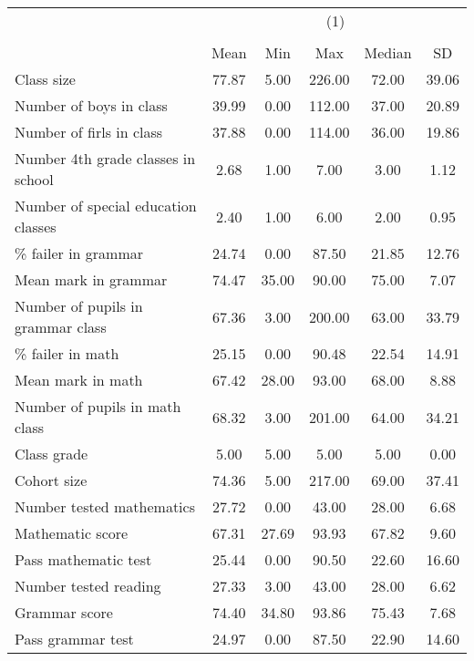 {
\def\sym#1{\ifmmode^{#1}\else\(^{#1}\)\fi}
\begin{tabular}{l*{1}{ccccc}}
\hline\hline
                    &\multicolumn{5}{c}{(1)}                                         \\
                    &\multicolumn{5}{c}{}                                            \\
                    &        Mean&         Min&         Max&      Median&          SD\\
\hline
Class size          &       77.87&        5.00&      226.00&       72.00&       39.06\\
Number of boys in class&       39.99&        0.00&      112.00&       37.00&       20.89\\
Number of firls in class&       37.88&        0.00&      114.00&       36.00&       19.86\\
Number 4th grade classes in school&        2.68&        1.00&        7.00&        3.00&        1.12\\
Number of special education classes&        2.40&        1.00&        6.00&        2.00&        0.95\\
\% failer in grammar&       24.74&        0.00&       87.50&       21.85&       12.76\\
Mean mark in grammar&       74.47&       35.00&       90.00&       75.00&        7.07\\
Number of pupils in grammar class&       67.36&        3.00&      200.00&       63.00&       33.79\\
\% failer in math   &       25.15&        0.00&       90.48&       22.54&       14.91\\
Mean mark in math   &       67.42&       28.00&       93.00&       68.00&        8.88\\
Number of pupils in math class&       68.32&        3.00&      201.00&       64.00&       34.21\\
Class grade         &        5.00&        5.00&        5.00&        5.00&        0.00\\
Cohort size         &       74.36&        5.00&      217.00&       69.00&       37.41\\
Number tested mathematics&       27.72&        0.00&       43.00&       28.00&        6.68\\
Mathematic score    &       67.31&       27.69&       93.93&       67.82&        9.60\\
Pass mathematic test&       25.44&        0.00&       90.50&       22.60&       16.60\\
Number tested reading&       27.33&        3.00&       43.00&       28.00&        6.62\\
Grammar score       &       74.40&       34.80&       93.86&       75.43&        7.68\\
Pass grammar test   &       24.97&        0.00&       87.50&       22.90&       14.60\\
\hline\hline
\end{tabular}
}

